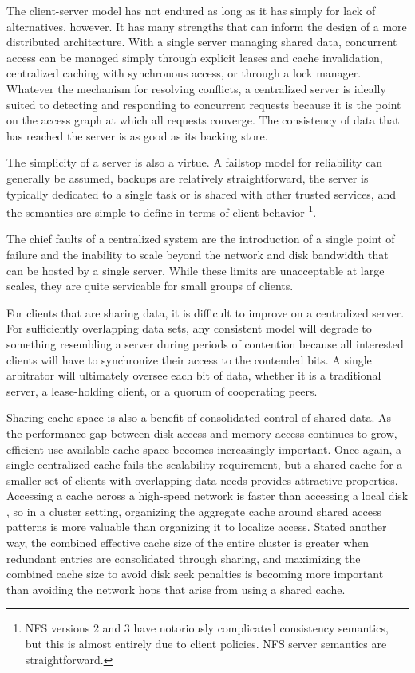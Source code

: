 The client-server model has not endured as long as it has simply for lack of alternatives, however. It has many strengths that can inform the design of a more distributed architecture. With a single server managing shared data, concurrent access can be managed simply through explicit leases and cache invalidation, centralized caching with synchronous access, or through a lock manager. Whatever the mechanism for resolving conflicts, a centralized server is ideally suited to detecting and responding to concurrent requests because it is the point on the access graph at which all requests converge. The consistency of data that has reached the server is as good as its backing store.

The simplicity of a server is also a virtue. A failstop model for reliability can generally be assumed, backups are relatively straightforward, the server is typically dedicated to a single task or is shared with other trusted services, and the semantics are simple to define in terms of client behavior%
\footnote{NFS versions 2 and 3 have notoriously complicated consistency semantics, but this is almost entirely due to client policies. NFS server semantics are straightforward.}.

The chief faults of a centralized system are the introduction of a single point of failure and the inability to scale beyond the network and disk bandwidth that can be hosted by a single server. While these limits are unacceptable at large scales, they are quite servicable for small groups of clients.

For clients that are sharing data, it is difficult to improve on a centralized server. For sufficiently overlapping data sets, any consistent model will degrade to something resembling a server during periods of contention because all interested clients will have to synchronize their access to the contended bits. A single arbitrator will ultimately oversee each bit of data, whether it is a traditional server, a lease-holding client, or a quorum of cooperating peers.

Sharing cache space is also a benefit of consolidated control of shared data. As the performance gap between disk access and memory access continues to grow, efficient use available cache space becomes increasingly important. Once again, a single centralized cache fails the scalability requirement, but a shared cache for a smaller set of clients with overlapping data needs provides attractive properties. Accessing a cache across a high-speed network is faster than accessing a local disk \cite{dahlin94b}, so in a cluster setting, organizing the aggregate cache around shared access patterns is more valuable than organizing it to localize access. Stated another way, the combined effective cache size of the entire cluster is greater when redundant entries are consolidated through sharing, and maximizing the combined cache size to avoid disk seek penalties is becoming more important than avoiding the network hops that arise from using a shared cache.

